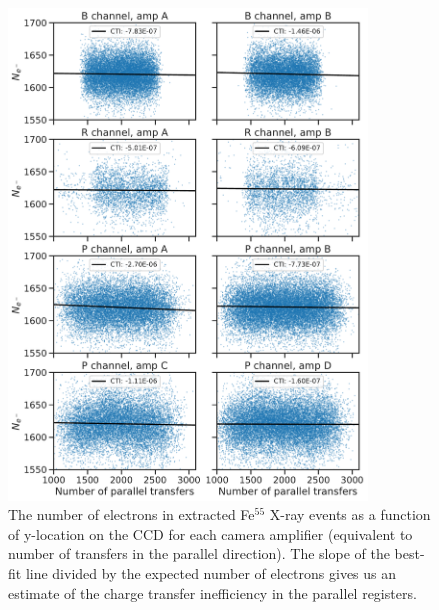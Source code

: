 \begin{figure}[htbp]
    \centering
    \includegraphics[width=0.85\textwidth]{figures/cte/xray_cte_parallel.pdf}
    \caption{The number of electrons in extracted Fe$^{55}$ X-ray events as a function of y-location on the CCD for each camera amplifier (equivalent to number of transfers in the parallel direction). The slope of the best-fit line divided by the expected number of electrons gives us an estimate of the charge transfer inefficiency in the parallel registers.}
    \label{fig:cte_xray}
\end{figure}

